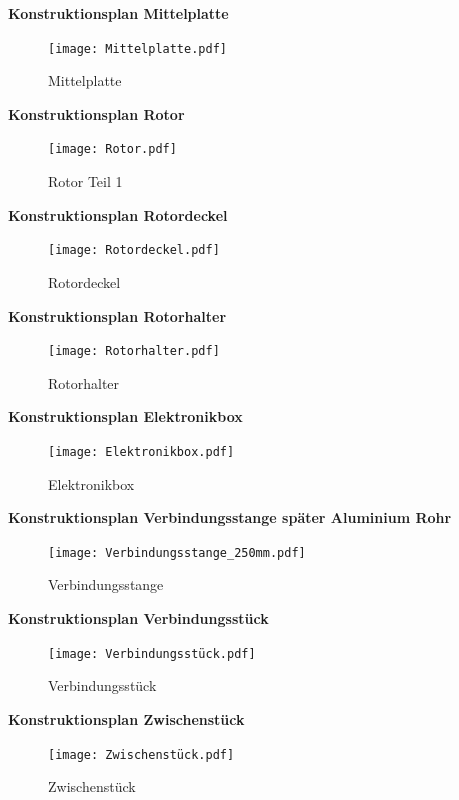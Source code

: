 \documentclass[a4paper,12pt]{article}
\begin{document}
\textbf{Konstruktionsplan Mittelplatte}

\begin{figure}[H]
    \centering
    \texttt{[image: Mittelplatte.pdf]}
    \caption{Mittelplatte}
    \label{fig:Mittelplatte}
\end{figure}

\textbf{Konstruktionsplan Rotor}

\begin{figure}[H]
    \centering
    \texttt{[image: Rotor.pdf]}
    \caption{Rotor Teil 1}
    \label{fig:Rotor_Teil1}
\end{figure}

\textbf{Konstruktionsplan Rotordeckel}

\begin{figure}[H]
    \centering
    \texttt{[image: Rotordeckel.pdf]}
    \caption{Rotordeckel}
    \label{fig:Rotordeckel}
\end{figure}


\textbf{Konstruktionsplan Rotorhalter}

\begin{figure}[H]
    \centering
    \texttt{[image: Rotorhalter.pdf]}
    \caption{Rotorhalter}
    \label{fig:Rotorhalter}
\end{figure}

\textbf{Konstruktionsplan Elektronikbox}

\begin{figure}[H]
    \centering
    \texttt{[image: Elektronikbox.pdf]}
    \caption{Elektronikbox}
    \label{fig:Elektronikbox}
\end{figure}

\textbf{Konstruktionsplan Verbindungsstange später Aluminium Rohr}

\begin{figure}[H]
    \centering
    \texttt{[image: Verbindungsstange\_250mm.pdf]}
    \caption{Verbindungsstange}
    \label{fig:Verbindungsstange}
\end{figure}

\textbf{Konstruktionsplan Verbindungsstück}

\begin{figure}[H]
    \centering
    \texttt{[image: Verbindungsstück.pdf]}
    \caption{Verbindungsstück}
    \label{fig:Verbindungsstück}
\end{figure}


\textbf{Konstruktionsplan Zwischenstück}

\begin{figure}[H]
    \centering
    \texttt{[image: Zwischenstück.pdf]}
    \caption{Zwischenstück}
    \label{fig:Zwischenstück}
\end{figure}
\end{document}
